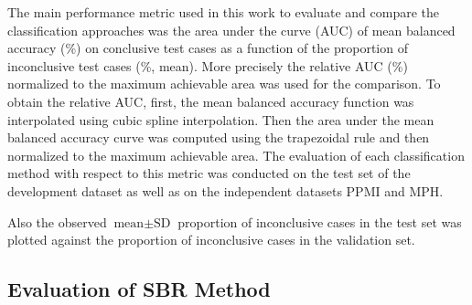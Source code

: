 
The main performance metric used in this work to evaluate and compare the classification approaches was 
the area under the curve (AUC) of mean balanced accuracy (\%) on conclusive test cases as a function of 
the proportion of inconclusive test cases (\%, mean).
More precisely the relative AUC (\%) normalized to the maximum achievable area was used for the comparison.
To obtain the relative AUC, 
first, the mean balanced accuracy function was interpolated using cubic spline interpolation.
Then the area under the mean balanced accuracy curve was computed using the trapezoidal rule 
and then normalized to the maximum achievable area.
The evaluation of each classification method with respect to this metric was conducted on the test set of the 
development dataset as well as on the independent datasets PPMI and MPH.


Also the observed $\text{mean} \pm \text{SD}$ proportion of inconclusive cases in the test set was plotted 
against the proportion of inconclusive cases in the validation set.



\subsection{Evaluation of SBR Method}
\label{subsec:eval_sbr}




